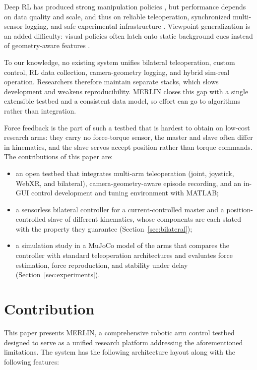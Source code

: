 \documentclass[a4paper, 10pt, conference]{ieeeconf}      %
\begin{document}
Deep RL has produced strong manipulation policies \cite{han2023deeprl, singh2019endtoend}, but performance depends on data quality and scale, and thus on reliable teleoperation, synchronized multi-sensor logging, and safe experimental infrastructure \cite{mahmood2018senseact}. Viewpoint generalization is an added difficulty: visual policies often latch onto static background cues instead of geometry-aware features \cite{jiang2025kyknow}.

To our knowledge, no existing system unifies bilateral teleoperation, custom control, RL data collection, camera-geometry logging, and hybrid sim-real operation. Researchers therefore maintain separate stacks, which slows development and weakens reproducibility. MERLIN closes this gap with a single extensible testbed and a consistent data model, so effort can go to algorithms rather than integration.

Force feedback is the part of such a testbed that is hardest to obtain on low-cost research arms: they carry no force-torque sensor, the master and slave often differ in kinematics, and the slave servos accept position rather than torque commands. The contributions of this paper are:
\begin{itemize}
\item an open testbed that integrates multi-arm teleoperation (joint, joystick, WebXR, and bilateral), camera-geometry-aware episode recording, and an in-GUI control development and tuning environment with MATLAB;
\item a sensorless bilateral controller for a current-controlled master and a position-controlled slave of different kinematics, whose components are each stated with the property they guarantee (Section~\ref{sec:bilateral});
\item a simulation study in a MuJoCo model of the arms that compares the controller with standard teleoperation architectures and evaluates force estimation, force reproduction, and stability under delay (Section~\ref{sec:experiments}).
\end{itemize}

\section{Contribution}

This paper presents MERLIN, a comprehensive robotic arm control testbed designed to serve as a unified research platform addressing the aforementioned limitations. The system has the following architecture layout along with the following features:
\end{document}
